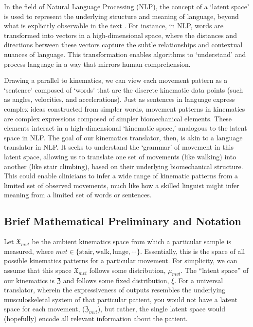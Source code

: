 In the field of Natural Language Processing (NLP), the concept of a `latent space' is used to represent the underlying structure and meaning of language, beyond what is explicitly observable in the text \cite{jurafskySpeechLanguageProcessing2009}.
For instance, in NLP, words are transformed into vectors in a high-dimensional space, where the distances and directions between these vectors capture the subtle relationships and contextual nuances of language.
This transformation enables algorithms to `understand' and process language in a way that mirrors human comprehension.

Drawing a parallel to kinematics, we can view each movement pattern as a `sentence' composed of `words' that are the discrete kinematic data points (such as angles, velocities, and accelerations).
Just as sentences in language express complex ideas constructed from simpler words, movement patterns in kinematics are complex expressions composed of simpler biomechanical elements.
These elements interact in a high-dimensional `kinematic space,' analogous to the latent space in NLP.
The goal of our kinematics translator, then, is akin to a language translator in NLP.
It seeks to understand the `grammar' of movement in this latent space, allowing us to translate one set of movements (like walking) into another (like stair climbing), based on their underlying biomechanical structure.
This could enable clinicians to infer a wide range of kinematic patterns from a limited set of observed movements, much like how a skilled linguist might infer meaning from a limited set of words or sentences.


\subsection{Brief Mathematical Preliminary and Notation}
Let $\mathfrak{X}_{mvt}$ be the ambient kinematics space from which a particular sample is measured, where $mvt \in \{\text{stair},\text{walk}, \text{lunge}, \cdots\}$.
Essentially, this is the space of all possible kinematics patterns for a particular movement.
For simplicity, we can assume that this space $\mathfrak{X}_{mvt}$ follows some distribution, $\mu_{mvt}$.
The ``latent space'' of our kinematics is $\mathfrak{Z}$ and follows some fixed distribution, $\xi$.
For a universal translator, wherein the expressiveness of outputs resembles the underlying musculoskeletal system of that particular patient, you would not have a latent space for each movement, ($\mathfrak{Z}_{mvt}$), but rather, the single latent space would (hopefully) encode all relevant information about the patient.

